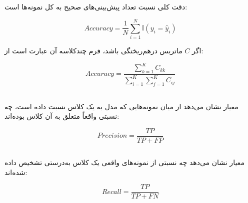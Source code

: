 \subsection{}

دقت کلی نسبت تعداد پیش‌بینی‌های صحیح به کل نمونه‌ها است:

\begin{equation}
Accuracy
=
\frac{1}{N}
\sum_{i=1}^{N}
\mathbb{I}(y_i=\hat{y}_i)
\end{equation}

اگر $C$ ماتریس درهم‌ریختگی باشد، فرم چندکلاسه آن عبارت است از:

\begin{equation}
Accuracy
=
\frac{
\sum_{k=1}^{K}C_{kk}
}{
\sum_{i=1}^{K}\sum_{j=1}^{K}C_{ij}
}
\end{equation}


\subsection{}

معیار
نشان می‌دهد از میان نمونه‌هایی که مدل به یک کلاس نسبت داده است، چه نسبتی واقعاً متعلق به آن کلاس بوده‌اند:

\begin{equation}
Precision
=
\frac{TP}{TP+FP}
\end{equation}


\subsection{}

معیار
نشان می‌دهد چه نسبتی از نمونه‌های واقعی یک کلاس به‌درستی تشخیص داده شده‌اند:

\begin{equation}
Recall
=
\frac{TP}{TP+FN}
\end{equation}


\subsection{}

